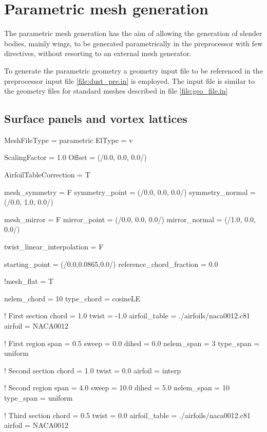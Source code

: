 \section{Parametric mesh generation}
\label{sec:Parametric_mesh_generation}

The parametric mesh generation has the aim of allowing the generation of slender bodies, mainly wings, to be generated parametrically in the preprocessor with few directives, without resorting to an external mesh generator. 

To generate the parametric geometry a geometry input file to be referenced in the preprocessor input file \ref{file:dust_pre.in} is employed. The input file is similar to the geometry files for standard meshes described in file \ref{file:geo_file.in}


\subsection{Surface panels and vortex lattices}

\begin{inputfile}[frame=single, caption={paramtetric\_geo\_file.in}, label={file:parametric_geo_file.in}]
MeshFileType = parametric
ElType = v

ScalingFactor = 1.0
Offset = (/0.0, 0.0, 0.0/)

AirfoilTableCorrection = T

mesh_symmetry = F
symmetry_point  = (/0.0, 0.0, 0.0/)
symmetry_normal = (/0.0, 1.0, 0.0/)

mesh_mirror = F
mirror_point  = (/0.0, 0.0, 0.0/)
mirror_normal = (/1.0, 0.0, 0.0/)

twist_linear_interpolation = F

starting_point = (/0.0,0.0865,0.0/)
reference_chord_fraction = 0.0

!mesh_flat = T

nelem_chord = 10
type_chord = cosineLE

! First section
chord = 1.0
twist = -1.0
airfoil_table = ./airfoils/naca0012.c81
airfoil = NACA0012

! First region
span = 0.5
sweep = 0.0
dihed = 0.0
nelem_span = 3 
type_span = uniform

! Second section
chord = 1.0
twist = 0.0
airfoil = interp

! Second region
span = 4.0
sweep = 10.0
dihed = 5.0
nelem_span = 10 
type_span = uniform

! Third section
chord = 0.5
twist =  0.0
airfoil_table = ./airfoils/naca0012.c81
airfoil = NACA0012

\end{inputfile}

